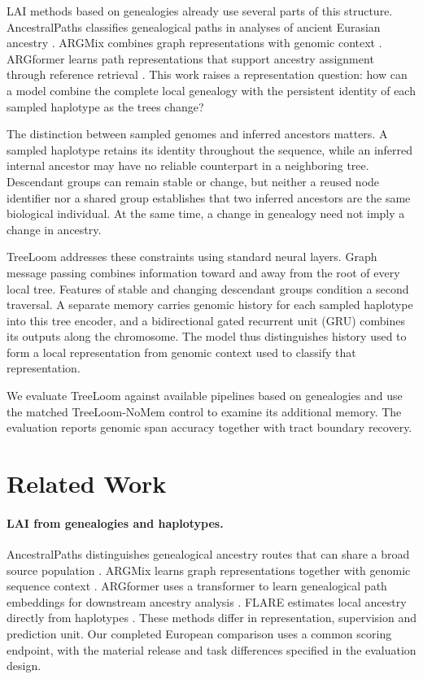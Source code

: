 \documentclass[letterpaper]{article}
\begin{document}
LAI methods based on genealogies already use several parts of this structure. AncestralPaths classifies genealogical paths in analyses of ancient Eurasian ancestry \citep{eurasians2024}. ARGMix combines graph representations with genomic context \citep{ancientancestry2026}. ARGformer learns path representations that support ancestry assignment through reference retrieval \citep{argformer2026}. This work raises a representation question: how can a model combine the complete local genealogy with the persistent identity of each sampled haplotype as the trees change?

The distinction between sampled genomes and inferred ancestors matters. A sampled haplotype retains its identity throughout the sequence, while an inferred internal ancestor may have no reliable counterpart in a neighboring tree. Descendant groups can remain stable or change, but neither a reused node identifier nor a shared group establishes that two inferred ancestors are the same biological individual. At the same time, a change in genealogy need not imply a change in ancestry.

TreeLoom addresses these constraints using standard neural layers. Graph message passing combines information toward and away from the root of every local tree. Features of stable and changing descendant groups condition a second traversal. A separate memory carries genomic history for each sampled haplotype into this tree encoder, and a bidirectional gated recurrent unit (GRU) combines its outputs along the chromosome. The model thus distinguishes history used to form a local representation from genomic context used to classify that representation.

We evaluate TreeLoom against available pipelines based on genealogies and use the matched TreeLoom-NoMem control to examine its additional memory. The evaluation reports genomic span accuracy together with tract boundary recovery.

\section{Related Work}
\paragraph{LAI from genealogies and haplotypes.}
AncestralPaths distinguishes genealogical ancestry routes that can share a broad source population \citep{eurasians2024}. ARGMix learns graph representations together with genomic sequence context \citep{ancientancestry2026}. ARGformer uses a transformer to learn genealogical path embeddings for downstream ancestry analysis \citep{argformer2026}. FLARE estimates local ancestry directly from haplotypes \citep{flare2023}. These methods differ in representation, supervision and prediction unit. Our completed European comparison uses a common scoring endpoint, with the material release and task differences specified in the evaluation design.
\end{document}
